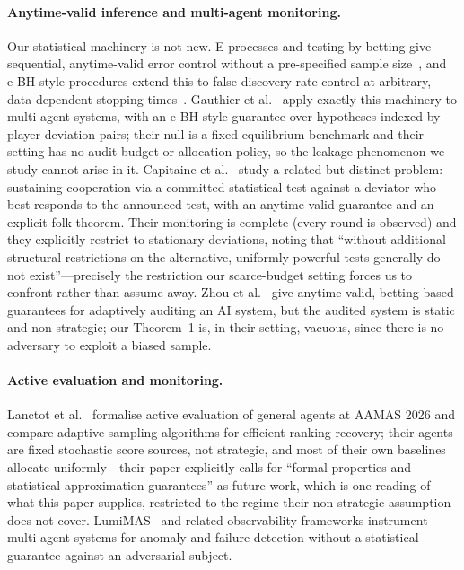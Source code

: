 \documentclass[sigconf,anonymous]{aamas}
\theoremstyle{plain}
\theoremstyle{definition}
\begin{document}
\paragraph{Anytime-valid inference and multi-agent monitoring.}
Our statistical machinery is not new. E-processes and testing-by-betting
give sequential, anytime-valid error control without a pre-specified sample
size~\cite{ramdas2022evalues}, and e-BH-style procedures extend this to
false discovery rate control at arbitrary, data-dependent stopping
times~\cite{wang2025stoppedebh}. Gauthier et al.~\cite{gauthier2026anytime}
apply exactly this machinery to multi-agent systems, with an e-BH-style
guarantee over hypotheses indexed by player-deviation pairs; their null is a
fixed equilibrium benchmark and their setting has no audit budget or
allocation policy, so the leakage phenomenon we study cannot arise in it.
Capitaine et al.~\cite{capitaine2026testthenpunish} study a related but
distinct problem: sustaining cooperation via a committed statistical test
against a deviator who best-responds to the announced test, with an
anytime-valid guarantee and an explicit folk theorem. Their monitoring is
complete (every round is observed) and they explicitly restrict to
stationary deviations, noting that ``without additional structural
restrictions on the alternative, uniformly powerful tests generally do not
exist''---precisely the restriction our scarce-budget setting forces us to
confront rather than assume away. Zhou et al.~\cite{zhou2026adaptive} give
anytime-valid, betting-based guarantees for adaptively auditing an AI
system, but the audited system is static and non-strategic; our Theorem~1
is, in their setting, vacuous, since there is no adversary to exploit a
biased sample.

\paragraph{Active evaluation and monitoring.}
Lanctot et al.~\cite{lanctot2026active} formalise active evaluation of
general agents at AAMAS 2026 and compare adaptive sampling algorithms for
efficient ranking recovery; their agents are fixed stochastic score sources,
not strategic, and most of their own baselines allocate uniformly---their
paper explicitly calls for ``formal properties and statistical approximation
guarantees'' as future work, which is one reading of what this paper
supplies, restricted to the regime their non-strategic assumption does not
cover. LumiMAS~\cite{lumimas2026} and related observability frameworks
instrument multi-agent systems for anomaly and failure detection without a
statistical guarantee against an adversarial subject.
\end{document}
